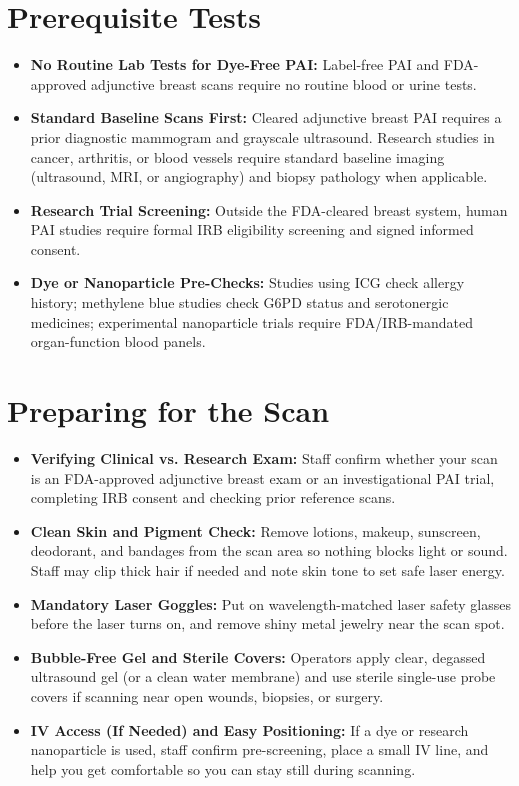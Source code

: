 \section{Prerequisite Tests}
\begin{itemize}
  \item \textbf{No Routine Lab Tests for Dye-Free PAI:} Label-free PAI and FDA-approved adjunctive breast scans require no routine blood or urine tests.
  \item \textbf{Standard Baseline Scans First:} Cleared adjunctive breast PAI requires a prior diagnostic mammogram and grayscale ultrasound. Research studies in cancer, arthritis, or blood vessels require standard baseline imaging (ultrasound, MRI, or angiography) and biopsy pathology when applicable.
  \item \textbf{Research Trial Screening:} Outside the FDA-cleared breast system, human PAI studies require formal IRB eligibility screening and signed informed consent.
  \item \textbf{Dye or Nanoparticle Pre-Checks:} Studies using ICG check allergy history; methylene blue studies check G6PD status and serotonergic medicines; experimental nanoparticle trials require FDA/IRB-mandated organ-function blood panels.
\end{itemize}

\section{Preparing for the Scan}
\begin{itemize}
  \item \textbf{Verifying Clinical vs. Research Exam:} Staff confirm whether your scan is an FDA-approved adjunctive breast exam or an investigational PAI trial, completing IRB consent and checking prior reference scans.
  \item \textbf{Clean Skin and Pigment Check:} Remove lotions, makeup, sunscreen, deodorant, and bandages from the scan area so nothing blocks light or sound. Staff may clip thick hair if needed and note skin tone to set safe laser energy.
  \item \textbf{Mandatory Laser Goggles:} Put on wavelength-matched laser safety glasses before the laser turns on, and remove shiny metal jewelry near the scan spot.
  \item \textbf{Bubble-Free Gel and Sterile Covers:} Operators apply clear, degassed ultrasound gel (or a clean water membrane) and use sterile single-use probe covers if scanning near open wounds, biopsies, or surgery.
  \item \textbf{IV Access (If Needed) and Easy Positioning:} If a dye or research nanoparticle is used, staff confirm pre-screening, place a small IV line, and help you get comfortable so you can stay still during scanning.
\end{itemize}

